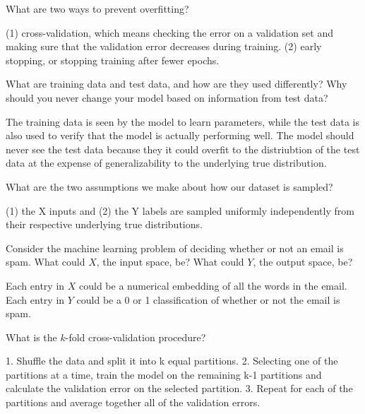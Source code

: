 \begin{problem}[2]
  What are two ways to prevent overfitting?
\end{problem}
\begin{solution}
  (1) cross-validation, which means checking the error on a validation set and making sure that the validation error decreases during training. (2) early stopping, or stopping training after fewer epochs.
\end{solution}

\begin{problem}[2]
  What are training data and test data, and how are they used differently? Why should you never change your model based on information from test data?
\end{problem}
\begin{solution}
  The training data is seen by the model to learn parameters, while the test data is also used to verify that the model is actually performing well. The model should never see the test data because they it could overfit to the distriubtion of the test data at the expense of generalizability to the underlying true distribution.
\end{solution}

\begin{problem}[2]
  What are the two assumptions we make about how our dataset is sampled?
\end{problem}
\begin{solution}
  (1) the X inputs and (2) the Y labels are sampled uniformly independently from their respective underlying true distributions.
\end{solution}

\begin{problem}[2]
  Consider the machine learning problem of deciding whether or not an email is spam. What could $X$, the input space, be? What could $Y$, the output space, be?
\end{problem}
\begin{solution}
  Each entry in $X$ could be a numerical embedding of all the words in the email. Each entry in $Y$ could be a 0 or 1 classification of whether or not the email is spam.
\end{solution}

\begin{problem}[2]
  What is the $k$-fold cross-validation procedure?
\end{problem}
\begin{solution}
  1. Shuffle the data and split it into k equal partitions.
  2. Selecting one of the partitions at a time, train the model on the remaining k-1 partitions and calculate the validation error  on the selected partition.
  3. Repeat for each of the partitions and average together all of the validation errors.
\end{solution}



